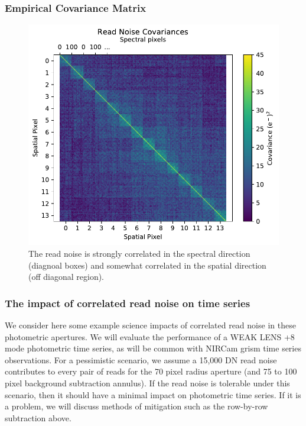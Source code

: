 \documentclass{aastex62}
\begin{document}
\subsubsection{Empirical Covariance Matrix}

\begin{figure}[!hbtp]
\centering
\includegraphics[width=.7\columnwidth]{spec_spatial_cov.pdf}
\caption{The read noise is strongly correlated in the spectral direction (diagnoal boxes) and somewhat correlated in the spatial direction (off diagonal region).}\label{fig:covSpeSpatial}
\end{figure}

\subsubsection{The impact of correlated read noise on time series}
We consider here some example science impacts of correlated read noise in these photometric apertures.
We will evaluate the performance of a WEAK LENS +8 mode photometric time series, as will be common with NIRCam grism time series observations.
For a pessimistic scenario, we assume a 15,000 DN read noise contributes to every pair of reads for the 70 pixel radius aperture (and 75 to 100 pixel background subtraction annulus).
If the read noise is tolerable under this scenario, then it should have a minimal impact on photometric time series.
If it is a problem, we will discuss methods of mitigation such as the row-by-row subtraction above.
\end{document}
